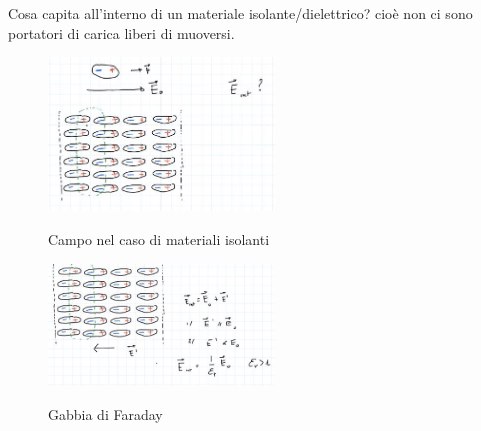 Cosa capita all'interno di un materiale isolante/dielettrico? cioè non ci sono portatori di carica liberi di muoversi. 
	\begin{figure}[h]
	\begin{center}
		\includegraphics[width=6cm]{lezione9/images/8 Campo elettrico nei materiali.jpg}\\
		\caption{Campo nel caso di materiali isolanti}
	\end{center}
\end{figure}
	\begin{figure}[h]
	\begin{center}
		\includegraphics[width=6cm]{lezione9/images/9 Campo elettrico nei materiali.jpg}\\
		\caption{Gabbia di Faraday}
	\end{center}
\end{figure}